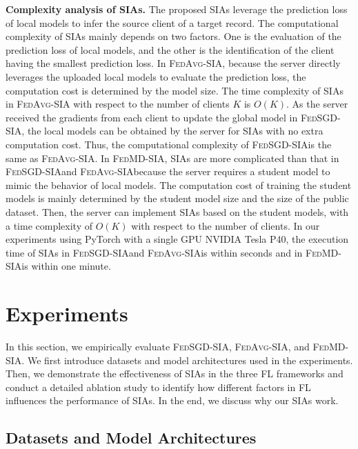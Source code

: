 \documentclass[10pt,journal,compsoc]{IEEEtran}
\newcommand*\fedavg{\textsc{FedAvg-SIA}}
\newcommand*\fedsgd{\textsc{FedSGD-SIA}}
\newcommand*\fedmd{\textsc{FedMD-SIA}}
\begin{document}
\noindent \textbf{Complexity analysis of SIAs. \;} The proposed SIAs leverage the prediction loss of local models to infer the source client of a target record. The computational complexity of SIAs mainly depends on two factors. One is the evaluation of the prediction loss of local models, and the other is the identification of the client having the smallest prediction loss. In \fedavg, because the server directly leverages the uploaded local models to evaluate the prediction loss, the computation cost is determined by the model size. The time complexity of SIAs in \fedavg\; with respect to the number of clients $K$ is $O(K)$. As the server received the gradients from each client to update the global model in \fedsgd, the local models can be obtained by the server for SIAs with no extra computation cost. Thus, the computational complexity of \fedsgd\;is the same as \fedavg. In \fedmd, SIAs are more complicated than that in \fedsgd\;and \fedavg\;because the server requires a student model to mimic the behavior of local models. The computation cost of training the student models is mainly determined by the student model size and the size of the public dataset. Then, the server can implement SIAs based on the student models, with a time complexity of $O(K)$ with respect to the number of clients. In our experiments using PyTorch with a single GPU NVIDIA Tesla P40, the execution time of SIAs in \fedsgd\;and \fedavg\;is within seconds and in \fedmd\;is within one minute.

\section{Experiments}\label{sec::04}
In this section, we empirically evaluate \fedsgd, \fedavg, and \fedmd. We first introduce datasets and model architectures used in the experiments. Then, we demonstrate the effectiveness of SIAs in the three FL frameworks and conduct a detailed ablation study to identify how different factors in FL influences the performance of SIAs. In the end, we discuss why our SIAs work.
\subsection{Datasets and Model Architectures}
\end{document}
